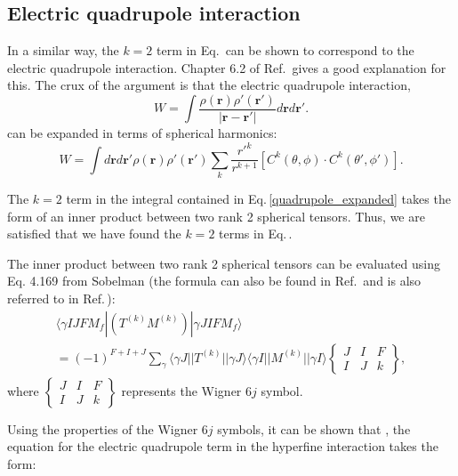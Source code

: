 \subsection{Electric quadrupole interaction}
In a similar way, the $k=2$ term in Eq.\,\label{TkMk_hyperfine} can be shown to correspond to the electric quadrupole interaction. Chapter 6.2 of Ref.\,\cite{sobelman_spectra} gives a good explanation for this. The crux of the argument is that the electric quadrupole interaction,
\begin{equation}
W=\int\frac{\rho(\mathbf{r})\rho'(\mathbf{r}')}{|\mathbf{r}-\mathbf{r}'|}d\mathbf{r}d\mathbf{r'}.
\end{equation}
can  be expanded in terms of spherical harmonics: 
\begin{equation}
W=\int d\mathbf{r}d\mathbf{r'}
\rho(\mathbf{r})\rho'(\mathbf{r}')\sum_k \frac{r'^k}{r^{k+1}}[C^k(\theta,\phi)\cdot C^k(\theta',\phi')] \label{quadrupole_expanded}.
\end{equation}

The $k=2$ term in the integral contained in Eq.\,\ref{quadrupole_expanded} takes the form of an inner product between two rank 2 spherical tensors. Thus, we are satisfied that we have found the $k=2$ terms in Eq.\,\cite{TkMk_hyperfine}.

The inner product between two rank 2 spherical tensors can be evaluated using Eq. 4.169 from Sobelman \cite{sobelman_spectra} (the formula can also be found in Ref.\,\cite{Racah2} and is also referred to in Ref.\,\cite{schwartz_hyperfine_expansion}):
\begin{multline}\label{4169_combine_diff_tensors}
\langle\gamma I J F M_f|(T^{(k)}M^{(k)})|\gamma J I F M_f\rangle \\
=
(-1)^{F+I+J} \sum_{\gamma} \langle\gamma J||T^{(k)}||\gamma J\rangle
\langle\gamma I || M^{(k)} ||\gamma I\rangle
\begin{Bmatrix}
J & I & F \\
I & J & k
\end{Bmatrix},
\end{multline}
where 
$\begin{Bmatrix}
J & I & F \\
I & J & k
\end{Bmatrix}$ represents the Wigner $6j$ symbol. 

Using the properties of the Wigner $6j$ symbols, it can be shown that \cite{cuaMITnotes}\cite{sobelman_spectra}, 
the equation for the electric quadrupole term in the hyperfine interaction takes the form:

